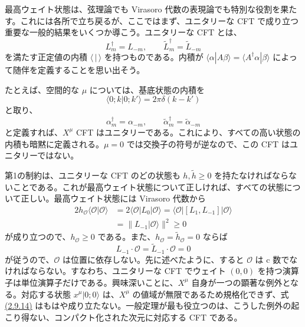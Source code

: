 
最高ウェイト状態は、弦理論でも Virasoro 代数の表現論でも特別な役割を果たす。これには各所で立ち戻るが、ここではまず、ユニタリーな CFT で成り立つ重要な一般的結果をいくつか導こう。ユニタリーな CFT とは、
\begin{equation}
L_m^\dagger=L_{-m},\qquad
\widetilde L_m^\dagger=\widetilde L_{-m}
\tag{2.9.11}\label{eq:2.9.11}
\end{equation}
を満たす正定値の内積 $\langle\,|\,\rangle$ を持つものである。内積が $\langle\alpha|A\beta\rangle=\langle A^\dagger\alpha|\beta\rangle$ によって随伴を定義することを思い出そう。

たとえば、空間的な $\mu$ については、基底状態の内積を
\begin{equation}
\langle0;k|0;k'\rangle=2\pi\delta(k-k')
\tag{2.9.12}\label{eq:2.9.12}
\end{equation}
と取り、
\begin{equation}
\alpha_m^\dagger=\alpha_{-m},\qquad
\widetilde\alpha_m^\dagger=\widetilde\alpha_{-m}
\tag{2.9.13}\label{eq:2.9.13}
\end{equation}
と定義すれば、$X^\mu$ CFT はユニタリーである。これにより、すべての高い状態の内積も暗黙に定義される。$\mu=0$ では交換子の符号が逆なので、この CFT はユニタリーではない。

第1の制約は、ユニタリーな CFT のどの状態も $h,\widetilde h\geq0$ を持たなければならないことである。これが最高ウェイト状態について正しければ、すべての状態について正しい。最高ウェイト状態には Virasoro 代数から
\begin{equation}
\begin{aligned}
2h_{\mathcal O}\langle\mathcal O|\mathcal O\rangle
&=2\langle\mathcal O|L_0|\mathcal O\rangle
=\langle\mathcal O|[L_1,L_{-1}]|\mathcal O\rangle\\
&=\bigl\|L_{-1}\lvert\mathcal O\rangle\bigr\|^2\geq0
\end{aligned}
\tag{2.9.14}\label{eq:2.9.14}
\end{equation}
が成り立つので、$h_{\mathcal O}\geq0$ である。また、$h_{\mathcal O}=\widetilde h_{\mathcal O}=0$ ならば
\begin{equation}
L_{-1}\cdot\mathcal O=\widetilde L_{-1}\cdot\mathcal O=0
\tag{2.9.15}\label{eq:2.9.15}
\end{equation}
が従うので、$\mathcal O$ は位置に依存しない。先に述べたように、すると $\mathcal O$ は c 数でなければならない。すなわち、ユニタリーな CFT でウェイト $(0,0)$ を持つ演算子は単位演算子だけである。興味深いことに、$X^\mu$ 自身が一つの顕著な例外となる。対応する状態 $x^\mu\lvert0;0\rangle$ は、$X^\mu$ の値域が無限であるため規格化できず、式 \hyperref[eq:2.9.14]{(2.9.14)} はもはや成り立たない。一般定理が最も役立つのは、こうした例外の起こり得ない、コンパクト化された次元に対応する CFT である。

